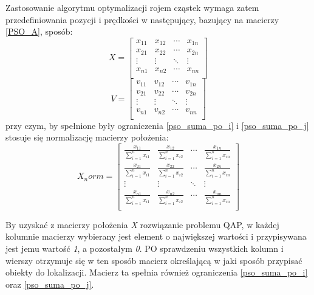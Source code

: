 Zastosowanie algorytmu optymalizacji rojem cząstek wymaga zatem przedefiniowania pozycji i prędkości w następujący, bazujący na macierzy \ref{PSO_A}, sposób:
\newline
\begin{equation}
X=
\begin{bmatrix}
x_{11} & x_{12} & \cdots & x_{1n} \\
x_{21} & x_{22} & \cdots & x_{2n} \\
\vdots & \vdots & \ddots & \vdots \\
x_{n1} & x_{n2} & \cdots & x_{nn} \\
\end{bmatrix}
\end{equation} 
\newline
\begin{equation}
V=
\begin{bmatrix}
v_{11} & v_{12} & \cdots & v_{1n} \\
v_{21} & v_{22} & \cdots & v_{2n} \\
\vdots & \vdots & \ddots & \vdots \\
v_{n1} & v_{n2} & \cdots & v_{nn} \\
\end{bmatrix}
\end{equation}
\newline
przy czym, by spełnione były ograniczenia \ref{pso_suma_po_i} i \ref{pso_suma_po_j} stosuje się normalizację macierzy położenia:
\newline
\begin{equation}
X_norm=
\begin{bmatrix}
\frac{x_{11}}{\sum\limits_{i=1}^n x_{i1}} & \frac{x_{12}}{\sum\limits_{i=1}^n x_{i2}} & \cdots &\frac{x_{1n}}{\sum\limits_{i=1}^n x_{in}} \\
\frac{x_{21}}{\sum\limits_{i=1}^n x_{i1}} & \frac{x_{22}}{\sum\limits_{i=1}^n x_{i2}} & \cdots & \frac{x_{2n}}{\sum\limits_{i=1}^n x_{in}} \\
\vdots & \vdots & \ddots & \vdots \\
\frac{x_{n1}}{\sum\limits_{i=1}^n x_{i1}} & \frac{x_{n2}}{\sum\limits_{i=1}^n x_{i2}} & \cdots & \frac{x_{nn}}{\sum\limits_{i=1}^n x_{in}} \\
\end{bmatrix}
\end{equation}
\newline

By uzyskać z macierzy położenia \textit{X} rozwiązanie problemu QAP, w każdej kolumnie macierzy wybierany jest element o największej wartości i przypisywana jest jemu wartość \textit{1}, a pozostałym \textit{0}. PO sprawdzeniu wszystkich kolumn i wierszy otrzymuje się w ten sposób macierz określającą w jaki sposób przypisać obiekty do lokalizacji. Macierz ta spełnia również ograniczenia \ref{pso_suma_po_i} oraz \ref{pso_suma_po_j}.

